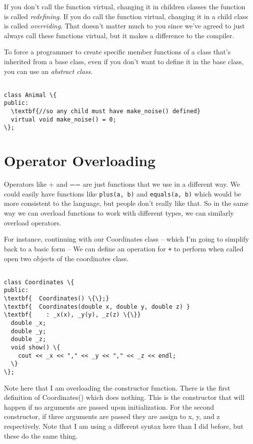 \documentclass{IEEEtran}
\begin{document}
 If you don't call the function virtual, changing it in children classes the function is called \textit{redefining}. If you do call the function virtual, changing it in a child class is called \textit{overriding}. That doesn't matter much to you since we've agreed to just always call these functions virtual, but it makes a difference to the compiler.
 
To force a programmer to create specific member functions of a class that's inherited from a base class, even if you don't want to define it in the base class, you can use an \textit{abstract class}.


\begin{Verbatim}[fontsize=\scriptsize, xleftmargin=.3in, commandchars=\\\{\}]

class Animal \{
public:
  \textbf{//so any child must have make_noise() defined}
  virtual void make_noise() = 0; 
\};

\end{Verbatim}


\section{Operator Overloading}

Operators like + and == are just functions that we use in a different way. We could easily have functions like \verb|plus(a, b)| and \verb|equals(a, b)| which would be more consistent to the language, but people don't really like that. So in the same way we can overload functions to work with different types, we can similarly overload operators.

For instance, continuing with our Coordinates class -- which I'm going to simplify back to a basic form -- We can define an operation for \verb|+| to perform when called open two objects of the coordinates class.

\begin{Verbatim}[fontsize=\scriptsize, xleftmargin=.3in, commandchars=\\\{\}]

class Coordinates \{
public:
\textbf{  Coordinates() \{\};}
\textbf{  Coordinates(double x, double y, double z) }
\textbf{    : _x(x), _y(y), _z(z) \{\}}
  double _x;
  double _y;
  double _z;
  void show() \{
    cout << _x << "," << _y << "," << _z << endl;
  \}
\};

\end{Verbatim}

Note here that I am overloading the constructor function. There is the first definition of Coordinates() which does nothing. This is the constructor that will happen if no arguments are passed upon initialization. For the second constructor, if three arguments are passed they are assign to x, y, and z respectively. Note that I am using a different syntax here than I did before, but these do the same thing. 
\end{document}
